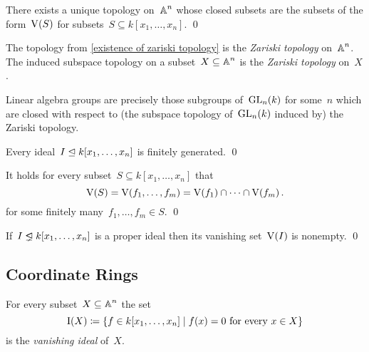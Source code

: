 \begin{corollary}
  \label{existence of zariski topology}
  There exists a unique topology on~$\operatorname{\mathbb{A}}^n$ whose closed subsets are the subsets of the form~$\operatorname{V}(S)$ for subsets~$S \subseteq k[x_1, \dotsc, x_n]$.
  \qed
\end{corollary}


\begin{definition}
  The topology from \cref{existence of zariski topology} is the \emph{Zariski topology} on~$\operatorname{\mathbb{A}}^n$.
  The induced subspace topology on a subset~$X \subseteq \operatorname{\mathbb{A}}^n$ is the \emph{Zariski topology} on~$X$.
\end{definition}


\begin{remark}
  Linear algebra groups are precisely those subgroups of~$\operatorname{GL}_n(k)$ for some~$n$ which are closed with respect to (the subspace topology of~$\operatorname{GL}_n(k)$ induced by) the Zariski topology.
\end{remark}


\begin{theorem}[Hilbert]
  Every ideal~$I \trianglelefteq k[x_1, \dotsc, x_n]$ is finitely generated.
  \qed
\end{theorem}


\begin{corollary}
  It holds for every subset~$S \subseteq k[x_1, \dotsc, x_n]$ that
  \[
      \operatorname{V}(S)
    = \operatorname{V}(f_1, \dotsc, f_m)
    = \operatorname{V}(f_1) \cap \dotsb \cap \operatorname{V}(f_m) \,.
  \]
  for some finitely many~$f_1, \dotsc, f_m \in S$.
  \qed
\end{corollary}


\begin{theorem}
  If~$I \ideallneq k[x_1, \dotsc, x_n]$ is a proper ideal then its vanishing set~$\operatorname{V}(I)$ is nonempty.
  \qed
\end{theorem}





\subsection{Coordinate Rings}


\begin{definition}
  For every subset~$X \subseteq \operatorname{\mathbb{A}}^n$ the set
  \[
              \videal(X)
    \defined  \{
                f \in k[x_1, \dotsc, x_n]
              \suchthat
                \text{$f(x) = 0$ for every~$x \in X$}
              \}
  \]
  is the \emph{vanishing ideal} of~$X$.
\end{definition}


